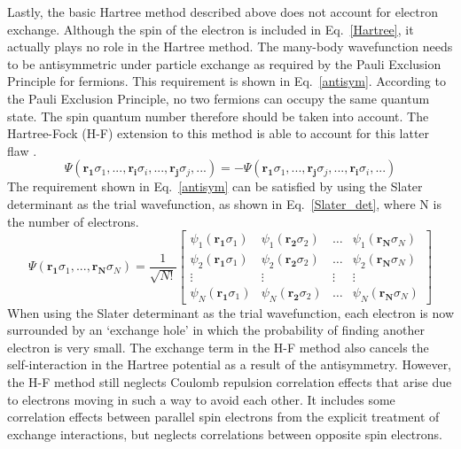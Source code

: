 \documentclass[11pt, twoside]{report}
\begin{document}
Lastly, the basic Hartree method described above does not account for electron exchange. Although the spin of the electron is included in Eq.~\ref{Hartree}, it actually plays no role in the Hartree method. The many-body wavefunction needs to be antisymmetric under particle exchange as required by the Pauli Exclusion Principle for fermions. This requirement is shown in Eq.~\ref{antisym}. According to the Pauli Exclusion Principle, no two fermions can occupy the same quantum state. The spin quantum number therefore should be taken into account. The Hartree-Fock (H-F) extension to this method is able to account for this latter flaw \cite{Prasad_ch2}.
\begin{equation}\label{antisym}
\Psi(\mathbf{r_1}\sigma_1, ..., \mathbf{r_i}\sigma_i, ..., \mathbf{r_j}\sigma_j, ...) = - \Psi(\mathbf{r_1}\sigma_1, ..., \mathbf{r_j}\sigma_j, ..., \mathbf{r_i}\sigma_i, ...)
\end{equation}
The requirement shown in Eq.~\ref{antisym} can be satisfied by using the Slater determinant as the trial wavefunction, as shown in Eq.~\ref{Slater_det}, where N is the number of electrons.
\begin{equation}\label{Slater_det}
\Psi(\mathbf{r_1}\sigma_1, ..., \mathbf{r_N}\sigma_N) = \frac{1}{\sqrt{N!}} \begin{bmatrix}
\psi_1(\mathbf{r_1}\sigma_1) & \psi_1(\mathbf{r_2}\sigma_2) & \dots & \psi_1(\mathbf{r_N}\sigma_N) \\
\psi_2(\mathbf{r_1}\sigma_1) & \psi_2(\mathbf{r_2}\sigma_2) & \dots & \psi_2(\mathbf{r_N}\sigma_N) \\
\vdots & \vdots & \vdots & \vdots \\
\psi_N(\mathbf{r_1}\sigma_1) & \psi_N(\mathbf{r_2}\sigma_2) & \dots & \psi_N(\mathbf{r_N}\sigma_N) 
\end{bmatrix}
\end{equation}
When using the Slater determinant as the trial wavefunction, each electron is now surrounded by an `exchange hole' in which the probability of finding another electron is very small. The exchange term in the H-F method also cancels the self-interaction in the Hartree potential as a result of the antisymmetry.
However, the H-F method still neglects Coulomb repulsion correlation effects that arise due to electrons moving in such a way to avoid each other. It includes some correlation effects between parallel spin electrons from the explicit treatment of exchange interactions, but neglects correlations between opposite spin electrons. 
\end{document}

